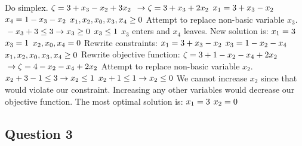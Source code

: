\documentclass{article}
\begin{document}
\newline Do simplex.
$\\\zeta = 3 + x_3 - x_2 + 3x_2$
$\\\to \zeta = 3 + x_3 + 2x_2$
$\\ x_1 = 3 + x_3 - x_2$
$\\ x_4 = 1 - x_3 - x_2$
$\\ x_1, x_2, x_0, x_3, x_4 \geq 0$
\newline Attempt to replace non-basic variable $x_3$.
$\\-x_3 + 3 \leq 3 \to x_3 \geq 0$
$\\x_3 \leq 1$
\newline $x_3$ enters and $x_4$ leaves.
\newline New solution is:
$\\x_1 = 3$
$\\x_3 = 1$
$\\x_2, x_0, x_4 = 0$
\newline Rewrite constraints:
$\\ x_1 = 3 + x_3 - x_2$
$\\ x_3 = 1 - x_2 - x_4$
$\\ x_1, x_2, x_0, x_3, x_4 \geq 0$
\newline Rewrite objective function:
$\\\zeta = 3 + 1 - x_2 - x_4 + 2x_2$
$\\\to \zeta = 4 - x_2 - x_4 + 2x_2$
\newline Attempt to replace non-basic variable $x_2$.
$\\ x_2 + 3 - 1 \leq 3 \to x_2 \leq 1$
$\\ x_2 + 1 \leq 1 \to x_2 \leq 0$
\newline We cannot increase $x_2$ since that would violate our constraint. Increasing any other variables would decrease our objective function. The most optimal solution is:
$\\x_1 = 3$
$\\x_2 = 0$

\newpage
\subsection*{Question 3}

\newpage
\end{document}
